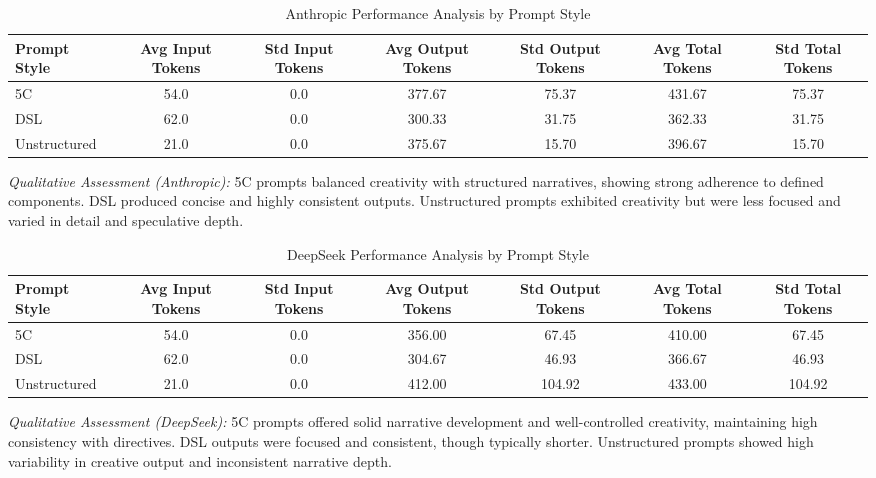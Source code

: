 \documentclass[10pt, a4paper]{article}
\begin{document}
\begin{table}[H]
    \centering
    \caption{Anthropic Performance Analysis by Prompt Style}
    \label{tab:anthropic_performance}
    \begin{adjustbox}{max width=\linewidth}
    \begin{tabular}{@{}lcccccc@{}}
        \toprule
        \textbf{Prompt Style} & \textbf{Avg Input Tokens} & \textbf{Std Input Tokens} & \textbf{Avg Output Tokens} & \textbf{Std Output Tokens} & \textbf{Avg Total Tokens} & \textbf{Std Total Tokens} \\
        \midrule
        5C           & 54.0 & 0.0 & 377.67 & 75.37 & 431.67 & 75.37 \\
        DSL          & 62.0 & 0.0 & 300.33 & 31.75 & 362.33 & 31.75 \\
        Unstructured & 21.0 & 0.0 & 375.67 & 15.70 & 396.67 & 15.70 \\
        \bottomrule
    \end{tabular}
    \end{adjustbox}
    \vspace{4pt}
    \parbox{\linewidth}{\small\textit{Qualitative Assessment (Anthropic):} 5C prompts balanced creativity with structured narratives, showing strong adherence to defined components. DSL produced concise and highly consistent outputs. Unstructured prompts exhibited creativity but were less focused and varied in detail and speculative depth.}
\end{table}

\begin{table}[H]
    \centering
    \caption{DeepSeek Performance Analysis by Prompt Style}
    \label{tab:deepseek_performance}
    \begin{adjustbox}{max width=\linewidth}
    \begin{tabular}{@{}lcccccc@{}}
        \toprule
        \textbf{Prompt Style} & \textbf{Avg Input Tokens} & \textbf{Std Input Tokens} & \textbf{Avg Output Tokens} & \textbf{Std Output Tokens} & \textbf{Avg Total Tokens} & \textbf{Std Total Tokens} \\
        \midrule
        5C           & 54.0 & 0.0 & 356.00 & 67.45 & 410.00 & 67.45 \\
        DSL          & 62.0 & 0.0 & 304.67 & 46.93 & 366.67 & 46.93 \\
        Unstructured & 21.0 & 0.0 & 412.00 & 104.92 & 433.00 & 104.92 \\
        \bottomrule
    \end{tabular}
    \end{adjustbox}
    \vspace{4pt}
    \parbox{\linewidth}{\small\textit{Qualitative Assessment (DeepSeek):} 5C prompts offered solid narrative development and well-controlled creativity, maintaining high consistency with directives. DSL outputs were focused and consistent, though typically shorter. Unstructured prompts showed high variability in creative output and inconsistent narrative depth.}
\end{table}
\end{document}
